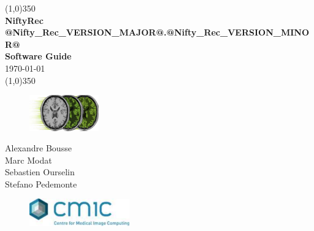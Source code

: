 \documentclass[12pt,a4paper]{report}
\begin{document}

\thispagestyle{empty}

\begin{titlepage}

\vspace*{1.0cm} 
    \begin{center}
      \line(1,0){350}\\
      \LARGE
      \textbf{NiftyRec @Nifty_Rec_VERSION_MAJOR@.@Nifty_Rec_VERSION_MINOR@}\\
      \large
      \textbf{Software Guide}\\
      \vspace{1.0cm}
      \small \today \\
      \line(1,0){350}\\
    \end{center}

    \begin{figure}[!h]
      \begin{center}
        \includegraphics[width=3.0cm]{niftyrec_logo}
      \end{center}
    \end{figure}


\vspace*{4.0cm} 
\large
\begin{flushright}
  Alexandre Bousse\\
  Marc Modat\\
  Sebastien Ourselin\\
  Stefano Pedemonte\\
\end{flushright}

\vspace*{1.5cm}
  \begin{figure}[htbp]
    \begin{flushright}
      \includegraphics[width=4.3cm]{logo_cmic}
    \end{flushright}
  \end{figure}

\end{titlepage}
\end{document}
